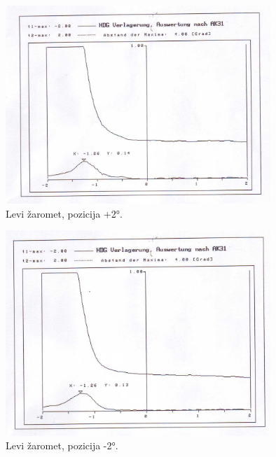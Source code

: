 \documentclass[oneside, a4paper, 12pt]{book}
\begin{document}
\begin{figure}
\begin{center}
\includegraphics[width=10cm]{slike/fotometer-levi-+2.jpg}
\end{center}
\caption{Levi žaromet, pozicija +2°.}
\label{pic:opt-g}
\end{figure}

\begin{figure}
\begin{center}
\includegraphics[width=10cm]{slike/fotometer-levi--2.jpg}
\end{center}
\caption{Levi žaromet, pozicija -2°.}
\label{pic:opt-g}
\end{figure}
\end{document}
